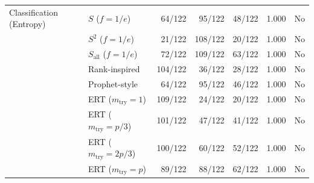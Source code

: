\begin{table}[t]
\begin{tabular}{@{}llrrrrc@{}}
\addlinespace
Classification (Entropy) & $S$ ($f=1/e$) & 64/122 & 95/122 & 48/122 & 1.000 & No \\
 & $S^{2}$ ($f=1/e$) & 21/122 & 108/122 & 20/122 & 1.000 & No \\
 & $S_{\mathrm{all}}$ ($f=1/e$) & 72/122 & 109/122 & 63/122 & 1.000 & No \\
 & Rank-inspired & 104/122 & 36/122 & 28/122 & 1.000 & No \\
 & Prophet-style & 64/122 & 95/122 & 46/122 & 1.000 & No \\
 & ERT ($m_{\mathrm{try}}=1$) & 109/122 & 24/122 & 20/122 & 1.000 & No \\
 & ERT ($m_{\mathrm{try}}=p/3$) & 101/122 & 47/122 & 41/122 & 1.000 & No \\
 & ERT ($m_{\mathrm{try}}=2p/3$) & 100/122 & 60/122 & 52/122 & 1.000 & No \\
 & ERT ($m_{\mathrm{try}}=p$) & 89/122 & 88/122 & 62/122 & 1.000 & No \\
\bottomrule
\end{tabular}
\end{table}
